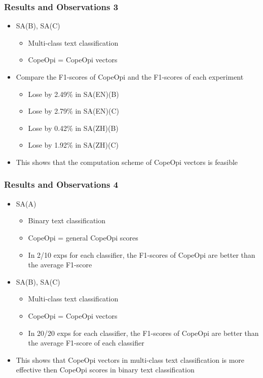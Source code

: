 \documentclass[mathserif]{beamer}
\begin{document}
\begin{frame}
\frametitle{Results and Observations 3}
	\begin{itemize}
	\item SA(B), SA(C)
		\begin{itemize}
		\item Multi-class text classification
		\item CopeOpi = CopeOpi vectors
		\end{itemize}
	\item Compare the F1-scores of CopeOpi and the F1-scores of each experiment
		\begin{itemize}
		\item Lose by 2.49\% in SA(EN)(B)
		\item Lose by 2.79\% in SA(EN)(C)
		\item Lose by 0.42\% in SA(ZH)(B)
		\item Lose by 1.92\% in SA(ZH)(C)
		\end{itemize}
	\item This shows that the computation scheme of CopeOpi vectors is feasible
	\end{itemize}
\end{frame}

\begin{frame}
\frametitle{Results and Observations 4}
	\begin{itemize}
	\item SA(A)
		\begin{itemize}
		\item Binary text classification
		\item CopeOpi = general CopeOpi scores
		\item In 2/10 exps for each classifier, the F1-scores of CopeOpi are better than the average F1-score
		\end{itemize}
	\item SA(B), SA(C)
		\begin{itemize}
		\item Multi-class text classification
		\item CopeOpi = CopeOpi vectors
		\item In 20/20 exps for each classifier, the F1-scores of CopeOpi are better than the average F1-score of each classifier
		\end{itemize}
	\item This shows that CopeOpi vectors in multi-class text classification is more effective then CopeOpi scores in binary text classification
	\end{itemize}
\end{frame}
\end{document}
